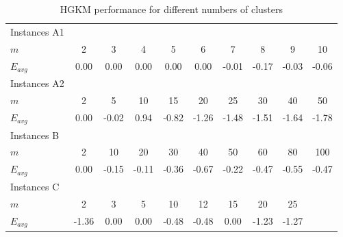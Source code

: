 \begin{table}[!h]
\centering
\begin{tabular}{@{}lccccccccc@{}}
\toprule
Instances A1 &       &       &       &       &       &       &       &       &       \\
$m$          & 2     & 3     & 4     & 5     & 6     & 7     & 8     & 9     & 10    \\
$E_{avg}$    & 0.00  & 0.00  & 0.00  & 0.00  & 0.00  & -0.01 & -0.17 & -0.03 & -0.06 \\ \midrule
Instances A2 &       &       &       &       &       &       &       &       &       \\
$m$          & 2     & 5     & 10    & 15    & 20    & 25    & 30    & 40    & 50    \\
$E_{avg}$    & 0.00  & -0.02 & 0.94  & -0.82 & -1.26 & -1.48 & -1.51 & -1.64 & -1.78 \\ \midrule
Instances B  &       &       &       &       &       &       &       &       &       \\
$m$          & 2     & 10    & 20    & 30    & 40    & 50    & 60    & 80    & 100   \\
$E_{avg}$    & 0.00  & -0.15 & -0.11 & -0.36 & -0.67 & -0.22 & -0.47 & -0.55 & -0.47 \\ \midrule
Instances C  &       &       &       &       &       &       &       &       &       \\
$m$          & 2     & 3     & 5     & 10    & 12    & 15    & 20    & 25    &       \\
$E_{avg}$    & -1.36 & 0.00  & 0.00  & -0.48 & -0.48 & 0.00  & -1.23 & -1.27 &       \\ \bottomrule
\end{tabular}
\caption{HGKM performance for different numbers of clusters}
\label{m-analysis}
\end{table}